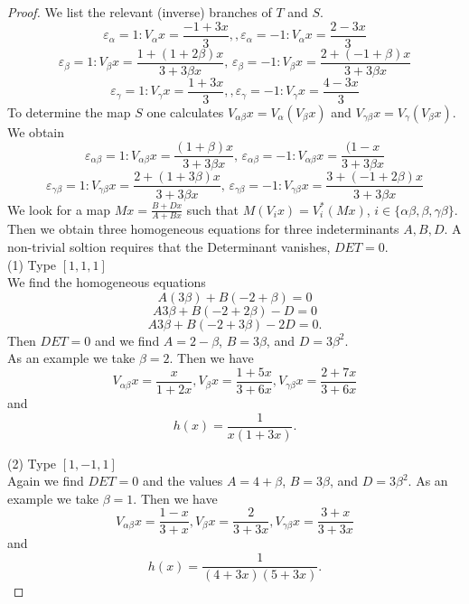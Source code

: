 \documentclass[10pt,a4paper]{amsart}
\begin{document}
	\begin{proof}
	We list the relevant (inverse) branches of $T$ and $S$.
	$$ \varepsilon_\alpha =1: V_\alpha x = \frac{-1+3x}{3}  , , \varepsilon_\alpha =-1: V_\alpha x = \frac{2 - 3x}{3} $$          
		$$ \varepsilon_\beta =1: V_\beta x = \frac{1 + (1+2 \beta)x}{3 + 3 \beta x}, \, \varepsilon_\beta = -1 : V_\beta x = \frac{2 + (-1 + \beta )x}{3 + 3\beta x}$$
		$$ \varepsilon_\gamma =1: V_\gamma x = \frac{1+3x}{3}  , , \varepsilon_\gamma =-1: V_\gamma x = \frac{4 - 3x}{3}           $$
	To determine the map $S$ one calculates  $V_{\alpha \beta}x = V_\alpha (V_\beta x)$
	and $V_{\gamma \beta}x = V_\gamma (V_\beta x)$.\\	
	We obtain
	$$ \varepsilon_{\alpha\beta} = 1: V_{\alpha\beta} x = \frac{(1+\beta)x}{3 + 3 \beta x}, \,\varepsilon_{\alpha\beta} = -1: V_{\alpha\beta} x = \frac{(1 - x}{3 + 3 \beta x}$$
		$$ \varepsilon_{\gamma\beta} = 1: V_{\gamma\beta} x = \frac{2+(1+3\beta)x}{3 + 3 \beta x}, \,\varepsilon_{\gamma\beta} = -1: V_{\gamma\beta} x = \frac{3 +(-1+2\beta)  x}{3 + 3 \beta x}$$
	 We look for a map $Mx = \frac{B + D x}{A+ Bx}$ such that $M (V_i x) = V_i^{*} (Mx)$, $ i \in \{\alpha \beta, \beta, \gamma \beta\}$.
	Then we obtain three homogeneous equations for three indeterminants $A, B, D$. A non-trivial  soltion requires that the Determinant vanishes,  $DET = 0$.\\ 
	(1)  Type $[1,1,1]$\\
	We find the homogeneous equations
	$$ A(3\beta) + B(-2 + \beta) = 0$$
	$$ A 3\beta + B(-2 + 2\beta) - D =0$$
	$$A3\beta + B (-2 + 3\beta) -2D = 0.$$
	Then $DET = 0$ and we find $A= 2- \beta$, $B= 3\beta$, and $D=3\beta^2$.\\
	As an example we take $\beta = 2$. Then we have $$V_{\alpha \beta}x  = \frac{x}{1+2x}, V_\beta x = \frac{1+5x}{3+6x}, V_{\gamma \beta}x = \frac{2+7x}{3+6x} $$ and $$h(x) = \frac{1}{x(1+3x)}.$$
	
	(2) Type $[1,-1,1]$\\
	Again we find $DET = 0$ and the values $A= 4 + \beta$, $B= 3 \beta$, and $D= 3 \beta^2$.	
		As an example we take $\beta = 1$. Then we have $$V_{\alpha \beta}x  = \frac{1-x}{3+x}, V_\beta x = \frac{2}{3+3x}, V_{\gamma \beta}x = \frac{3+x}{3+3x} $$ and $$h(x) = \frac{1}{(4+3x)(5+3x)}.$$
		
	\end{proof}
\end{document}
